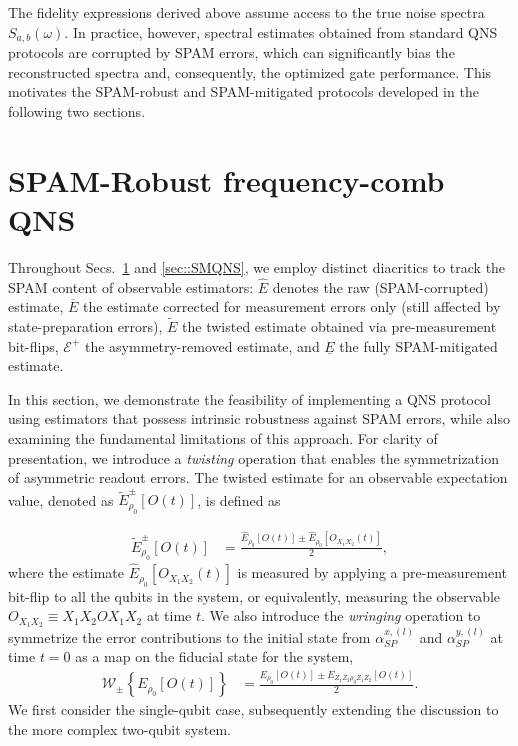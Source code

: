 \documentclass[%
 reprint,
superscriptaddress,
 amsmath,amssymb,
 aps,
pra,
]{revtex4-2}
\newcommand{\qk}[1]{{\color{OliveGreen}#1}}
\begin{document}
\qk{The fidelity expressions derived above assume access to the true noise spectra $S_{a,b}(\omega)$. In practice, however, spectral estimates obtained from standard QNS protocols are corrupted by SPAM errors, which can significantly bias the reconstructed spectra and, consequently, the optimized gate performance. This motivates the SPAM-robust and SPAM-mitigated protocols developed in the following two sections.}


\section{SPAM-Robust frequency-comb QNS}
\label{sec::SRQNS}

\qk{Throughout Secs.~\ref{sec::SRQNS} and \ref{sec::SMQNS}, we employ distinct diacritics to track the SPAM content of observable estimators: $\hat{E}$ denotes the raw (SPAM-corrupted) estimate, $\overline{E}$ the estimate corrected for measurement errors only (still affected by state-preparation errors), $\tilde{E}$ the twisted estimate obtained via pre-measurement bit-flips, $\mathcal{E}^+$ the asymmetry-removed estimate, and $\underline{E}$ the fully SPAM-mitigated estimate.}

In this section, we demonstrate the feasibility of implementing a QNS protocol using estimators that possess intrinsic robustness against SPAM errors, while also examining the fundamental limitations of this approach. For clarity of presentation, we introduce a \textit{twisting} operation that enables the symmetrization of asymmetric readout errors. The twisted estimate for an observable expectation value, denoted as $\tilde{E}_{\rho_0}^\pm[O(t)]$, is defined as

\begin{align}
    \tilde{E}^\pm_{\rho_0}[O(t)]&=\frac{\hat{E}_{\rho_0}[O(t)]\pm\hat{E}_{\rho_0}[O_{X_1X_2}(t)]}{2},
\end{align}
where the estimate $\hat{E}_{\rho_0}[O_{X_1X_2}(t)]$ is measured by applying a pre-measurement bit-flip to all the qubits in the system, or equivalently, measuring the observable $O_{X_1X_2}\equiv X_1X_2 OX_1X_2$ at time $t$. We also introduce the \textit{wringing} operation to symmetrize the error contributions to the initial state from $\alpha^{x,(l)}_{SP}$ and $\alpha^{y,(l)}_{SP}$ at time $t=0$ as a map on the fiducial state for the system,
\begin{align}
    \mathcal{W}_\pm\left\{E_{\rho_0}[O(t)]\right\}&=\frac{E_{\rho_0}[O(t)]\pm E_{Z_1Z_2\rho_0Z_1Z_2}[O(t)]}{2}.
\end{align}
We first consider the single-qubit case, subsequently extending the discussion to the more complex two-qubit system.
\end{document}
